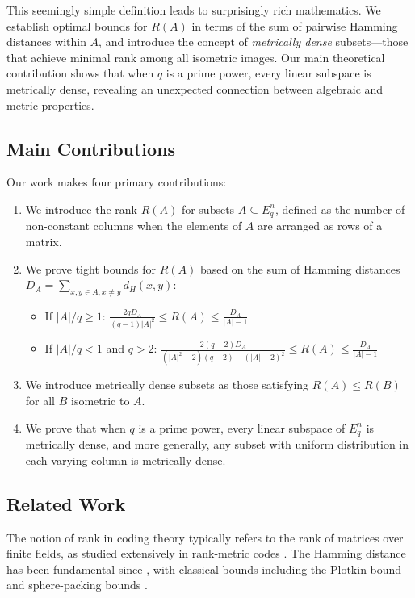 \documentclass[12pt]{article}
\newcommand{\Eqn}{E_q^n}
\renewcommand{\geq}{\geqslant}
\renewcommand{\leq}{\leqslant}
\begin{document}
This seemingly simple definition leads to surprisingly rich mathematics. We establish optimal bounds for $R(A)$ in terms of the sum of pairwise Hamming distances within $A$, and introduce the concept of \emph{metrically dense} subsets—those that achieve minimal rank among all isometric images. Our main theoretical contribution shows that when $q$ is a prime power, every linear subspace is metrically dense, revealing an unexpected connection between algebraic and metric properties.

\subsection{Main Contributions}

Our work makes four primary contributions:

\begin{enumerate}
\item We introduce the rank $R(A)$ for subsets $A \subseteq \Eqn$, defined as the number of non-constant columns when the elements of $A$ are arranged as rows of a matrix.

\item We prove tight bounds for $R(A)$ based on the sum of Hamming distances $D_A = \sum_{x,y \in A, x \neq y} d_H(x,y)$:
\begin{itemize}
\item If $|A|/q \geq 1$: $\frac{2qD_A}{(q-1)|A|^2} \leq R(A) \leq \frac{D_A}{|A|-1}$
\item If $|A|/q < 1$ and $q > 2$: $\frac{2(q-2)D_A}{(|A|^2-2)(q-2)-(|A|-2)^2} \leq R(A) \leq \frac{D_A}{|A|-1}$
\end{itemize}

\item We introduce metrically dense subsets as those satisfying $R(A) \leq R(B)$ for all $B$ isometric to $A$.

\item We prove that when $q$ is a prime power, every linear subspace of $\Eqn$ is metrically dense, and more generally, any subset with uniform distribution in each varying column is metrically dense.
\end{enumerate}

\subsection{Related Work}

The notion of rank in coding theory typically refers to the rank of matrices over finite fields, as studied extensively in rank-metric codes \cite{delsarte1978bilinear,gabidulin1985theory}. The Hamming distance has been fundamental since \cite{hamming1950error}, with classical bounds including the Plotkin bound \cite{plotkin1960binary} and sphere-packing bounds \cite{macwilliams1977theory}.
\end{document}
